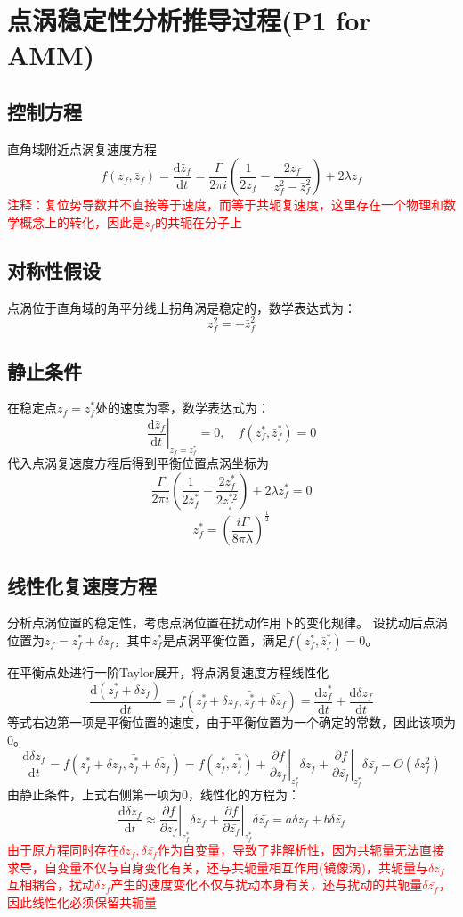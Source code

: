 
\section{点涡稳定性分析推导过程(P1 for AMM)}
\subsection{控制方程}
直角域附近点涡复速度方程
\[
f(z_{f}, \bar{z}_{f})=\frac{\mathrm{d}\bar{z}_{f}}{\mathrm{d}t}=\frac{\Gamma}{2\pi i}\left(\frac{1}{2z_{f}}-\frac{2z_{f}}{z_{f}^{2}-\bar{z}_{f}^{2}}\right)+2\lambda z_{f}
\]
\textcolor{red}{注释：复位势导数并不直接等于速度，而等于共轭复速度，这里存在一个物理和数学概念上的转化，因此是$z_{f}$的共轭在分子上}
\subsection{对称性假设}
点涡位于直角域的角平分线上拐角涡是稳定的，数学表达式为：
\[
z_{f}^{2}=-\bar{z}_{f}^{2}
\]
\subsection{静止条件}
在稳定点$z_{f}=z_{f}^{*}$处的速度为零，数学表达式为：
\[
\left.\frac{\mathrm{d}\bar{z}_{f}}{\mathrm{d}t}\right|_{z_f = z_f^{*}}=0, \quad f(z_{f}^{*}, \bar{z}_{f}^{*})=0
\]
代入点涡复速度方程后得到平衡位置点涡坐标为
\[
\frac{\Gamma}{2\pi i}\left(\frac{1}{2z_{f}^{*}}-\frac{2z_{f}^{*}}{2z_{f}^{*2}}\right)+2\lambda z_{f}^{*}=0
\]
\[
z_{f}^{*}=\left(\frac{i\Gamma}{8\pi \lambda}\right)^{\frac{1}{2}}
\]
\subsection{线性化复速度方程}
分析点涡位置的稳定性，考虑点涡位置在扰动作用下的变化规律。
设扰动后点涡位置为$z_{f}=z_{f}^{*}+\delta z_{f}$，其中$z_{f}^{*}$是点涡平衡位置，满足$f(z_{f}^{*}, \bar{z}_{f}^{*})=0$。

在平衡点处进行一阶Taylor展开，将点涡复速度方程线性化
\[
\frac{\mathrm{d}(z_{f}^{*}+\delta z_{f})}{\mathrm{d}t}=f(z_{f}^{*}+\delta z_{f}, \bar{z_{f}^{*}}+\bar{\delta z_{f}})=\frac{\mathrm{d}z_{f}^{*}}{\mathrm{d}t}+\frac{\mathrm{d}\delta z_{f}}{\mathrm{d}t}
\]
等式右边第一项是平衡位置的速度，由于平衡位置为一个确定的常数，因此该项为0。
\[
\frac{\mathrm{d}\delta z_{f}}{\mathrm{d}t}=f(z_{f}^{*}+\delta z_{f}, \bar{z_{f}^{*}}+\bar{\delta z_{f}})
=f(z_{f}^{*},\bar{z_{f}^{*}})+\left.\frac{\partial f}{\partial z_{f}}\right|_{z_{f}^{*}}\delta z_{f}+\left.\frac{\partial f}{\partial \bar{z_{f}}}\right|_{z_{f}^{*}}\delta \bar{z_{f}}+O(\delta z_{f}^{2})
\]
由静止条件，上式右侧第一项为0，线性化的方程为：
\[
\frac{\mathrm{d}\delta z_{f}}{\mathrm{d}t}\approx \left.\frac{\partial f}{\partial z_{f}}\right|_{z_{f}^{*}}\delta z_{f}+\left.\frac{\partial f}{\partial \bar{z_{f}}}\right|_{z_{f}^{*}}\delta \bar{z_{f}}=a\delta z_{f}+b\delta \bar{z_{f}}
\]
\textcolor{red}{由于原方程同时存在$\delta z_{f}, \delta \bar{z_{f}}$作为自变量，导致了非解析性，因为共轭量无法直接求导，自变量不仅与自身变化有关，还与共轭量相互作用(镜像涡)，共轭量与$\delta z_{f}$互相耦合，扰动$\delta z_{f}$产生的速度变化不仅与扰动本身有关，还与扰动的共轭量$\delta \bar{z_{f}}$，因此线性化必须保留共轭量}

